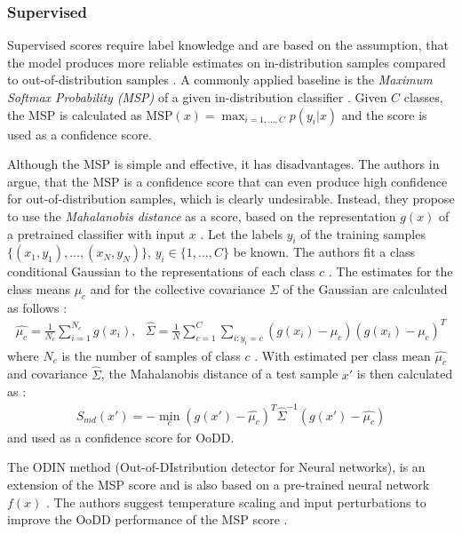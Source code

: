 \subsubsection{Supervised}
Supervised scores require label knowledge and are based on the assumption, that the model produces more reliable estimates on in-distribution samples compared to out-of-distribution samples \citep{Hendrycks2016a, Fort2021}.
A commonly applied baseline is the \textit{Maximum Softmax Probability (MSP)} of a given in-distribution classifier \citep{Hendrycks2016a}.
Given $C$ classes, the MSP is calculated as $\text{MSP}(x)=\max_{i=1,\dots,C}p(y_i|x)$ and the score is used as a confidence score.
\par
Although the MSP is simple and effective, it has disadvantages.
The authors in \citep{Lee2018} argue, that the MSP is a confidence score that can even produce high confidence for out-of-distribution samples, which is clearly undesirable.
Instead, they propose to use the \textit{Mahalanobis distance} as a score, based on the representation $g(x)$ of a pretrained classifier with input $x$ \citep{Lee2018}.
Let the labels $y_i$ of the training samples $\{(x_1,y_1),\dots, (x_N,y_N)\}$, $y_i \in \{1,\dots,C\}$ be known.
The authors fit a class conditional Gaussian to the representations of each class $c$ \citep{Lee2018}.
The estimates for the class means $\mu_c$ and for the collective covariance $\Sigma$ of the Gaussian are calculated as follows \citep{Lee2018}:
\begin{align}
	\hat{\mu_c} = \frac{1}{N_c}\sum_{i=1}^{N_c}g(x_i), \hspace{8pt} \hat{\Sigma} = \frac{1}{N}\sum_{c=1}^{C}\sum_{i: y_i=c}(g(x_i)-\mu_c)(g(x_i)-\mu_c)^T
\end{align}
where $N_c$ is the number of samples of class $c$ \citep{Lee2018}.
With estimated per class mean $\hat{\mu_c}$ and covariance $\hat{\Sigma}$, the Mahalanobis distance of a test sample $x'$ is then calculated as \citep{Lee2018}:
\begin{align}
	S_{md}(x') = - \min_c (g(x')-\hat{\mu_c})^T\hat{\Sigma}^{-1}(g(x')-\hat{\mu_c})
\end{align}
and used as a confidence score for OoDD.
\par
The ODIN method (Out-of-DIstribution detector for Neural networks), is an extension of the MSP score and is also based on a pre-trained neural network $f(x)$ \citep{Liang2018}.
The authors suggest temperature scaling and input perturbations to improve the OoDD performance of the MSP score \citep{Liang2018}.
